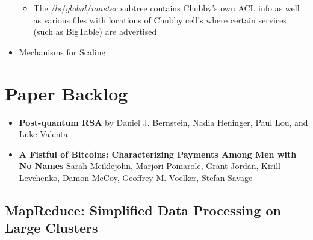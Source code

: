 \documentclass[a4paper]{article}
\begin{document}
\begin{itemize}
\begin{itemize}
\item The $/ls/global/master$ subtree contains Chubby's own ACL info as well as various files with locations of Chubby cell's where certain services (such as BigTable) are advertised  
\end{itemize}

\item Mechanisms for Scaling
\begin{itemize}

\end{itemize}

\end{itemize}


\section {Paper Backlog}

\begin{itemize}
\item \textbf{Post-quantum RSA} by Daniel J. Bernstein, Nadia Heninger, Paul Lou, and Luke Valenta

\item \textbf{A Fistful of Bitcoins: Characterizing Payments Among Men with No Names} Sarah Meiklejohn, Marjori Pomarole, Grant Jordan, Kirill Levchenko, Damon McCoy, Geoffrey M. Voelker, Stefan Savage
\end{itemize}

\subsection{MapReduce: Simplified Data Processing on Large Clusters}
\end{document}

